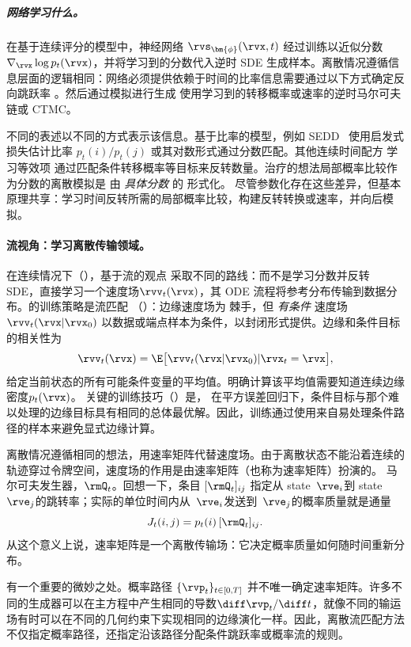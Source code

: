 \subparagraph{网络学习什么。}
在基于连续评分的模型中，神经网络
$\rvs_{\bm{\phi}}(\rvx, t)$ 经过训练以近似分数
$\nabla_{\rvx}\log p_t(\rvx)$，并将学习到的分数代入逆时 SDE 生成样本。离散情况遵循信息层面的逻辑相同：网络必须提供依赖于时间的比率信息需要通过以下方式确定反向跳跃率
。然后通过模拟进行生成
使用学习到的转移概率或速率的逆时马尔可夫链或 CTMC。

不同的表述以不同的方式表示该信息。基于比率的模型，例如 SEDD~\citep{lou2024discrete}
使用启发式损失估计比率 $p_t(i)/p_t(j)$ 或其对数形式通过分数匹配。其他连续时间配方
\citep{campbell2022continuous,sun2023scorebased} 学习等效项
通过匹配条件转移概率等目标来反转数量。治疗的想法局部概率比较作为分数的离散模拟是
由 \emph{ 具体分数 } 的 \citet{meng2022concrete} 形式化。
尽管参数化存在这些差异，但基本原理共享：学习时间反转所需的局部概率比较，构建反转转换或速率，并向后模拟。\paragraph{流视角：学习离散传输领域。}
在连续情况下（），基于流的观点
采取不同的路线：而不是学习分数并反转
SDE，直接学习一个速度场$\rvv_t(\rvx)$，其 ODE 流程将参考分布传输到数据分布。的训练策略是流匹配
（）：边缘速度场为
棘手，但 \emph{ 有条件 } 速度场
$\rvv_t(\rvx | \rvx_0)$ 以数据或端点样本为条件，以封闭形式提供。边缘和条件目标的相关性为
\[
\rvv_t(\rvx)
= \E \big[\rvv_t(\rvx | \rvx_0) | \rvx_t = \rvx\big],
\]
给定当前状态的所有可能条件变量的平均值。明确计算该平均值需要知道连续边缘
密度$p_t(\rvx)$。  关键的训练技巧（）是，
在平方误差回归下，条件目标与那个难以处理的边缘目标具有相同的总体最优解。因此，训练通过使用来自易处理条件路径的样本来避免显式边缘计算。

离散情况遵循相同的想法，用速率矩阵代替速度场。由于离散状态不能沿着连续的轨迹穿过令牌空间，速度场的作用是由速率矩阵（也称为速率矩阵）扮演的。
马尔可夫发生器，$\rmQ_t$。回想一下，条目 $[\rmQ_t]_{ij}$ 指定从 state~$\rve_i$到 state~$\rve_j$的跳转率；实际的单位时间内从~$\rve_i$发送到~$\rve_j$的概率质量就是通量
\[
J_t(i,j)=p_t(i)\,[\rmQ_t]_{ij}.
\]
从这个意义上说，速率矩阵是一个离散传输场：它决定概率质量如何随时间重新分布。

有一个重要的微妙之处。概率路径 $\{\rvp_t\}_{t\in[0,T]}$ 并不唯一确定速率矩阵。许多不同的生成器可以在主方程中产生相同的导数$\diff\rvp_t/\diff t$，就像不同的输运场有时可以在不同的几何约束下实现相同的边缘演化一样。因此，离散流匹配方法不仅指定概率路径，还指定沿该路径分配条件跳跃率或概率流的规则。

